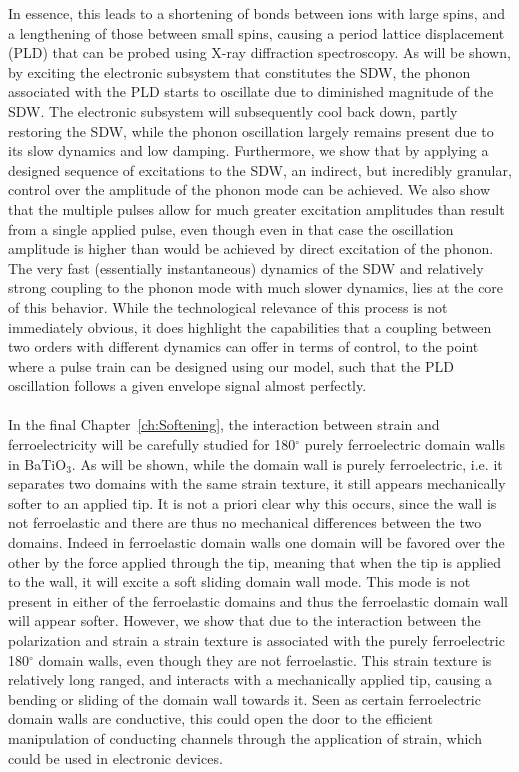 In essence, this leads to a shortening of bonds between ions with large spins, and a lengthening of those between small spins, causing a period lattice displacement (PLD) that can be probed using X-ray diffraction spectroscopy.
As will be shown, by exciting the electronic subsystem that constitutes the SDW, the phonon associated with the PLD starts to oscillate due to diminished magnitude of the SDW.
The electronic subsystem will subsequently cool back down, partly restoring the SDW, while the phonon oscillation largely remains present due to its slow dynamics and low damping.
Furthermore, we show that by applying a designed sequence of excitations to the SDW, an indirect, but incredibly granular, control over the amplitude of the phonon mode can be achieved.
We also show that the multiple pulses allow for much greater excitation amplitudes than result from a single applied pulse, even though even in that case the oscillation amplitude is higher than would be achieved by direct excitation of the phonon.
The very fast (essentially instantaneous) dynamics of the SDW and relatively strong coupling to the phonon mode with much slower dynamics, lies at the core of this behavior.
While the technological relevance of this process is not immediately obvious, it does highlight the capabilities that a coupling between two orders with different dynamics can offer in terms of control, to the point where a pulse train can be designed using our model, such that the PLD oscillation follows a given envelope signal almost perfectly.
\\\\
In the final Chapter~\ref{ch:Softening}, the interaction between strain and ferroelectricity will be carefully studied for 180$^\circ$ purely ferroelectric domain walls in BaTiO$_3$.
As will be shown, while the domain wall is purely ferroelectric, i.e. it separates two domains with the same strain texture, it still appears mechanically softer to an applied tip.
It is not a priori clear why this occurs, since the wall is not ferroelastic and there are thus no mechanical differences between the two domains.
Indeed in ferroelastic domain walls one domain will be favored over the other by the force applied through the tip, meaning that when the tip is applied to the wall, it will excite a soft sliding domain wall mode.
This mode is not present in either of the ferroelastic domains and thus the ferroelastic domain wall will appear softer.
However, we show that due to the interaction between the polarization and strain a strain texture is associated with the purely ferroelectric 180$^\circ$ domain walls, even though they are not ferroelastic.
This strain texture is relatively long ranged, and interacts with a mechanically applied tip, causing a bending or sliding of the domain wall towards it.
Seen as certain ferroelectric domain walls are conductive, this could open the door to the efficient manipulation of conducting channels through the application of strain, which could be used in electronic devices.

